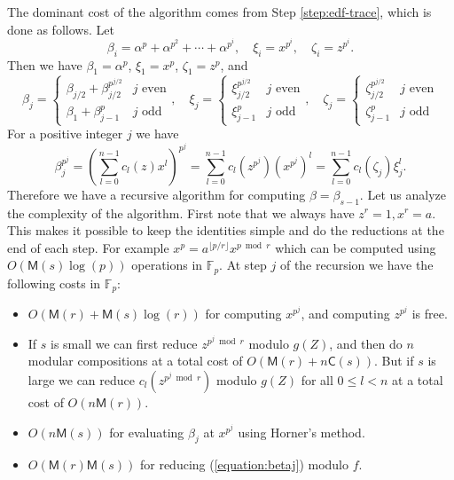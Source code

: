\documentclass[12pt]{article}
\theoremstyle{plain}
\theoremstyle{definition}
\def\F{\mathbb{F}}
\def\M{\mathsf{M}}
\def\CC{\mathsf{C}}
\newcounter{algorithm}
\begin{document}
The dominant cost of the algorithm comes from Step \ref{step:edf-trace}, which is done as follows. Let
\[ \beta_i = \alpha^p + \alpha^{p^2} + \cdots + \alpha^{p^i}, \quad \xi_i = x^{p^i}, \quad \zeta_i = z^{p^i}. \]
Then we have $\beta_1 = \alpha^p$, $\xi_1 = x^p$, $\zeta_1 = z^p$, and
\[
\beta_j = 
\begin{cases}
	\beta_{j / 2} + \beta_{j / 2}^{p^{j / 2}} & j \text{ even} \\
	\beta_1 + \beta_{j - 1}^p & j \text{ odd}
\end{cases}, \quad
\xi_j = 
\begin{cases}
	\xi_{j / 2}^{p^{j / 2}} & j \text{ even} \\
	\xi_{j - 1}^p & j \text{ odd}
\end{cases}, \quad
\zeta_j = 
\begin{cases}
	\zeta_{j / 2}^{p^{j / 2}} & j \text{ even} \\
	\zeta_{j - 1}^p & j \text{ odd}
\end{cases}
\]
For a positive integer $j$ we have
\begin{equation}
\label{equation:betaj}
	\beta_j^{p^j} = \left( \sum_{l = 0}^{n - 1}c_l(z)x^l \right)^{p^j} = \sum_{l = 0}^{n - 1}c_l(z^{p^j})(x^{p^j})^l = \sum_{l =
0}^{n - 1}c_l(\zeta_j)\xi_j^l.
\end{equation}
Therefore we have a recursive algorithm for computing $\beta = \beta_{s - 1}$. Let us analyze the complexity of the algorithm.
First note that we always have $z^r = 1, x^r = a$. This makes it possible to keep the identities simple and do the reductions at
the end of each step. For example $x^p = a^{\lfloor p / r\rfloor}x^{p \bmod r}$ which can be computed using $O(\M(s)\log(p))$
operations in $\F_p$. At step $j$ of the recursion we have the following costs in $\F_p$:
\begin{itemize}
	\item $O(\M(r) + \M(s)\log(r))$ for computing $x^{p^j}$, and computing $z^{p^j}$ is free.
	\item If $s$ is small we can first reduce $z^{p^j \bmod r}$ modulo $g(Z)$, and then do $n$ modular compositions at a total cost
of $O(\M(r) + n\CC(s))$. But if $s$ is large we can reduce $c_l(z^{p^j \bmod r})$ modulo $g(Z)$ for all $0 \le l < n$ at a total
cost of $O(n\M(r))$.
	\item $O(n\M(s))$ for evaluating $\beta_j$ at $x^{p^j}$ using Horner's method.
	\item $O(\M(r)\M(s))$ for reducing (\ref{equation:betaj}) modulo $f$.
\end{itemize}
\end{document}
